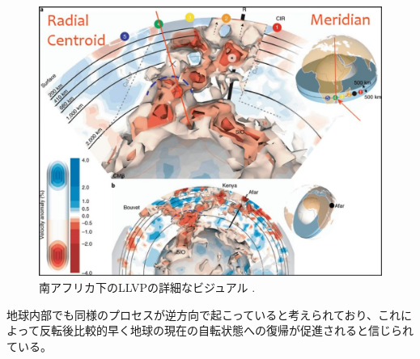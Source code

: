 \documentclass[10pt,twocolumn,letterpaper]{article}
\begin{document}
\begin{figure}[t]
\begin{center}
   \includegraphics[width=1\linewidth]{llvp.jpg}
\end{center}
   \caption{南アフリカ下のLLVPの詳細なビジュアル \cite{28}.}
\label{fig:12}
\label{fig:onecol}
\end{figure}


地球内部でも同様のプロセスが逆方向で起こっていると考えられており、これによって反転後比較的早く地球の現在の自転状態への復帰が促進されると信じられている。



\end{document}
